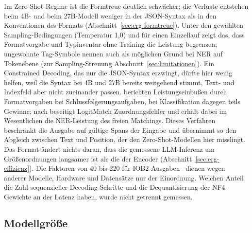 Im Zero-Shot-Regime ist die Formtreue deutlich schwächer; die Verluste
entstehen beim 4B- und beim 27B-Modell weniger in der JSON-Syntax als in
den Konventionen des Formats (Abschnitt~\ref{sec:erg-formtreue}).
Unter den gewählten Sampling-Bedingungen (Temperatur 1,0) und für einen
Einzellauf zeigt das, dass Formatvorgabe und Typinventar ohne
Training die Leistung begrenzen; ungewohnte Tag-Symbole nennen auch
\textcite{lu2024llmstruggle} als möglichen Grund bei NER auf Tokenebene (zur
Sampling-Streuung Abschnitt~\ref{sec:limitationen}).
Ein Constrained Decoding, das nur die JSON-Syntax erzwingt, dürfte hier
wenig helfen, weil die Syntax bei 4B und 27B bereits weitgehend stimmt,
Text- und Indexfeld aber nicht zueinander passen.
\textcite{tam2024speakfreely} berichten Leistungseinbußen durch
Formatvorgaben bei Schlussfolgerungsaufgaben, bei Klassifikation dagegen
teils Gewinne; nach \textcite{semin2026spanLabeling} beseitigt LogitMatch
Zuordnungsfehler und erhält dabei im Wesentlichen die NER-Leistung des
freien Matchings.
Dieses Verfahren beschränkt die Ausgabe auf gültige Spans der Eingabe und
übernimmt so den Abgleich zwischen Text und Position, der den
Zero-Shot-Modellen hier misslingt.
Das Format ändert nichts daran, dass die gemessene LLM-Inferenz um
Größenordnungen langsamer ist als die der Encoder
(Abschnitt~\ref{sec:erg-effizienz}). 
Die Faktoren von 40 bis 220 für IOB2-Ausgaben~\cite[Abschn.~III--IV]{obeidat2025llm} dienen wegen anderer Modelle, Hardware und
Datensätze nur der Einordnung.
Welchen Anteil die Zahl sequenzieller Decoding-Schritte und die
Dequantisierung der NF4-Gewichte an der Latenz haben, wurde nicht
getrennt gemessen.

\subsection{Modellgröße}
\label{sec:disk-groesse}

